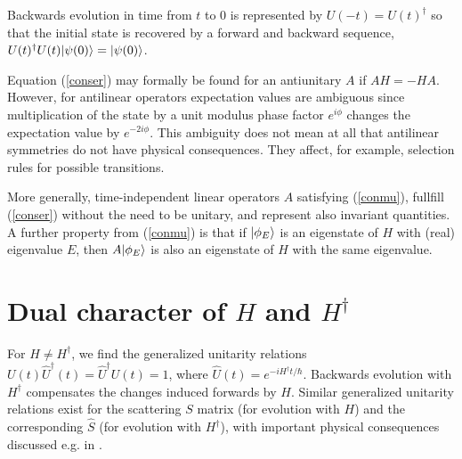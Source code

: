 Backwards evolution in time from $t$ to 0 is represented by $U(-t)=U(t)^\dagger$ so that the initial state is recovered by a forward and backward sequence,\linebreak $U(t)^{\dagger}U(t)|\psi(0)\rangle=|\psi(0)\rangle$.

Equation (\ref{conser}) may formally be found for an antiunitary $A$ if $AH = -HA$. However,
for antilinear operators expectation  values are ambiguous since multiplication of the state by a
unit modulus phase factor $e^{i\phi}$ changes the expectation value by $e^{-2i\phi}$.
This ambiguity
does not mean at all that antilinear symmetries do not have physical consequences.
They affect, for example, selection rules for possible transitions.


More generally, time-independent linear operators $A$ satisfying (\ref{conmu}), fullfill (\ref{conser}) without the
need to be unitary,
and represent also invariant quantities.
A further property from (\ref{conmu}) is that if $|\phi_E\rangle$ is an eigenstate of $H$ with (real) eigenvalue $E$, then
$A|\phi_E\rangle$ is also an eigenstate of $H$ with the same eigenvalue.
%
%
%
\section{Dual character of $H$ and $H^\dagger$}
%
%
%
For $H\neq H^\dagger$,
we find the generalized unitarity relations
$U(t)\widehat{U}^\dagger(t)=\widehat{U}^\dagger U(t)=1$, where $\widehat{U}(t)=e^{-iH^\dagger t/\hbar}$.
Backwards evolution with $H^\dagger$
compensates the changes induced forwards by $H$. Similar generalized unitarity relations exist for the scattering
$S$ matrix (for evolution with $H$) and the corresponding $\widehat{S}$ (for evolution with $H^\dagger$), with
important physical consequences discussed e.g. in \cite{Muga2004,Ruschhaupt2017}.
%

